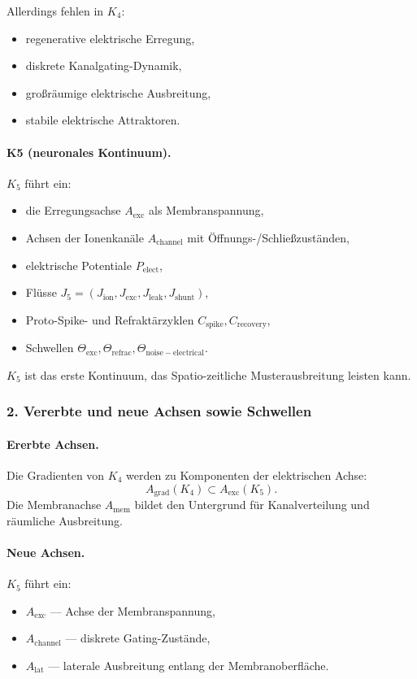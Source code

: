 Allerdings fehlen in $K_4$:
\begin{itemize}
  \item regenerative elektrische Erregung,
  \item diskrete Kanalgating-Dynamik,
  \item großräumige elektrische Ausbreitung,
  \item stabile elektrische Attraktoren.
\end{itemize}

\paragraph{K5 (neuronales Kontinuum).}
$K_5$ führt ein:
\begin{itemize}
  \item die Erregungsachse $A_{\mathrm{exc}}$ als Membranspannung,
  \item Achsen der Ionenkanäle $A_{\mathrm{channel}}$ mit Öffnungs-/Schließzuständen,
  \item elektrische Potentiale $P_{\mathrm{elect}}$,
  \item Flüsse $J_5 = (J_{\mathrm{ion}}, J_{\mathrm{exc}}, J_{\mathrm{leak}},
        J_{\mathrm{shunt}})$,
  \item Proto-Spike- und Refraktärzyklen $C_{\mathrm{spike}}, C_{\mathrm{recovery}}$,
  \item Schwellen $\Theta_{\mathrm{exc}}, \Theta_{\mathrm{refrac}},
        \Theta_{\mathrm{noise-electrical}}$.
\end{itemize}

$K_5$ ist das erste Kontinuum, das Spatio-zeitliche Musterausbreitung
leisten kann.

\subsubsection{2. Vererbte und neue Achsen sowie Schwellen}

\paragraph{Ererbte Achsen.}
Die Gradienten von $K_4$ werden zu Komponenten der elektrischen Achse:
\[
A_{\mathrm{grad}}(K_4) \subset A_{\mathrm{exc}}(K_5).
\]
Die Membranachse $A_{\mathrm{mem}}$ bildet den Untergrund für Kanalverteilung und
räumliche Ausbreitung.

\paragraph{Neue Achsen.}
$K_5$ führt ein:
\begin{itemize}
  \item $A_{\mathrm{exc}}$ — Achse der Membranspannung,
  \item $A_{\mathrm{channel}}$ — diskrete Gating-Zustände,
  \item $A_{\mathrm{lat}}$ — laterale Ausbreitung entlang der Membranoberfläche.
\end{itemize}

